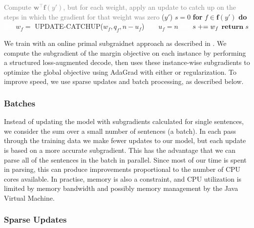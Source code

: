 \begin{algorithm}
\begin{multicols}{2}
\begin{algorithmic}[]
\begin{lefttopbot}[style=mdftight]
    \State \textcolor{gray}{Compute $\mathbf{w}^\top \mathbf{f}(y')$, but for each weight, apply an update to catch up on the steps in which the gradient for that weight was zero}
    ($y'$)
        \State $s = 0$
        \State \textbf{for} $f \in \mathbf{f}(y')$ \textbf{do}
        \State \textcolor{white}{\textbf{for}} $w_f = $ {\footnotesize UPDATE-CATCHUP}($w_f, q_f, n - u_f$)
        \State \textcolor{white}{\textbf{for}} $u_f = n$
        \State \textcolor{white}{\textbf{for}} $s \mathrel{+}= w_f$
        \State $\mathbf{return} \; s$
    \EndMyFunction
    \vspace{-3mm}
    \end{lefttopbot}
\end{algorithmic}
\end{multicols}
\vspace{-8mm}
\end{algorithm}

We train with an online primal subgraidnet approach \parencite{Ratliff:2007} as described in \textcite{Kummerfeld-etal:2015:EMNLP}.
We compute the subgradient of the margin objective on each instance by performing a structured loss-augmented decode, then uses these instance-wise subgradients to optimize the global objective using AdaGrad \parencite{Duchi:2011} with either \Lone or \Ltwo regularization.
To improve speed, we use sparse updates and batch processing, as described below.

\subsubsection{Batches}

Instead of updating the model with subgradients calculated for single sentences, we consider the sum over a small number of sentences (a batch).
In each pass through the training data we make fewer updates to our model, but each update is based on a more accurate subgradient.
This has the advantage that we can parse all of the sentences in the batch in parallel.
Since most of our time is spent in parsing, this can produce improvements proportional to the number of CPU cores available.
In practise, memory is also a constraint, and CPU utilization is limited by memory bandwidth and possibly memory management by the Java Virtual Machine.

\subsubsection{Sparse Updates}

